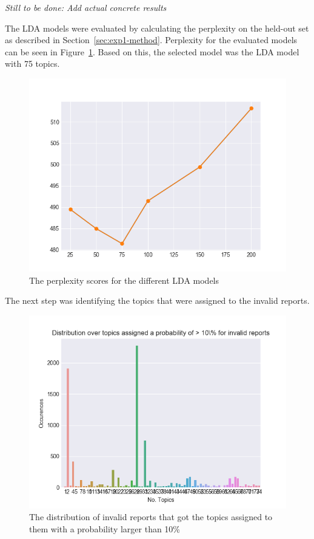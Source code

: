 \textit{Still to be done: Add actual concrete results}

The LDA models were evaluated by calculating the perplexity on the held-out set as described in Section~\ref{sec:exp1-method}.
Perplexity for the evaluated models can be seen in Figure~\ref{fig:lda-perplexity}.
Based on this, the selected model was the LDA model with 75 topics.

\begin{figure}
    \centering
    \includegraphics[scale=0.8]{figures/lda-perplexity.png}
    \caption{The perplexity scores for the different LDA models}
    \label{fig:lda-perplexity}
\end{figure}

The next step was identifying the topics that were assigned to the invalid reports.

\begin{figure}
    \centering
    \includegraphics[scale=0.8]{figures/distribution_invalid_reports_likely.png}
    \caption{The distribution of invalid reports that got the topics assigned to them with a probability larger than 10\%}
    \label{fig:invalid-reports-topic-dist-likely}
\end{figure}

